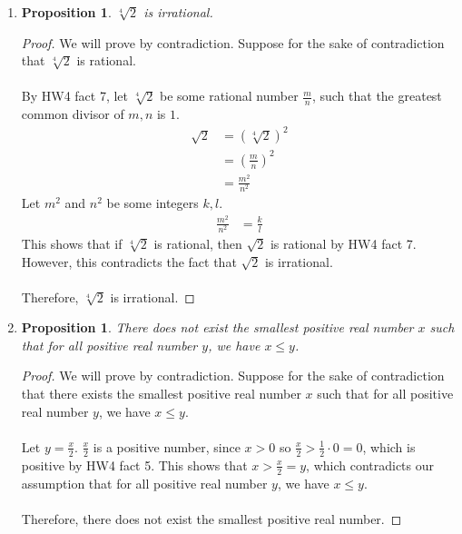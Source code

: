 \documentclass{article}
\newtheorem{prop}[thm]{Proposition}
\begin{document}
\begin{enumerate}
\item \begin{prop}
    $\sqrt[4]{2}$ is irrational.
\end{prop}

\begin{proof}
We will prove by contradiction. Suppose for the sake of contradiction that $\sqrt[4]{2}$ is rational. \\\\
By HW4 fact 7, let $\sqrt[4]{2}$ be some rational number $\frac{m}{n}$, such that the greatest common divisor of $m,n$ is $1$. 
\begin{align}
    \sqrt{2} &= (\sqrt[4]{2})^2 \\
    &= (\frac{m}{n})^2 \\
    &= \frac{m^2}{n^2}
\end{align}
Let $m^2$ and $n^2$ be some integers $k, l$.
\begin{align}
    \frac{m^2}{n^2} &= \frac{k}{l}
\end{align}
This shows that if $\sqrt[4]{2}$ is rational, then $\sqrt{2}$ is rational by HW4 fact 7. However, this contradicts the fact that $\sqrt{2}$ is irrational. \\\\
Therefore, $\sqrt[4]{2}$ is irrational.
\end{proof}

\item \begin{prop}
    There does not exist the smallest positive real number $x$ such that for all positive real number $y$, we have $x \leq y$.
\end{prop}
\begin{proof}
We will prove by contradiction. Suppose for the sake of contradiction that there exists the smallest positive real number $x$ such that for all positive real number $y$, we have $x \leq y$. \\\\
Let $y = \frac{x}{2}$. $\frac{x}{2}$ is a positive number, since $x > 0$ so $\frac{x}{2} > \frac{1}{2} \cdot 0 = 0$, which is positive by HW4 fact 5. This shows that $x > \frac{x}{2} = y$, which contradicts our assumption that for all positive real number $y$, we have $x \leq y$. \\\\
Therefore, there does not exist the smallest positive real number.
\end{proof}


\end{enumerate}
\end{document}
